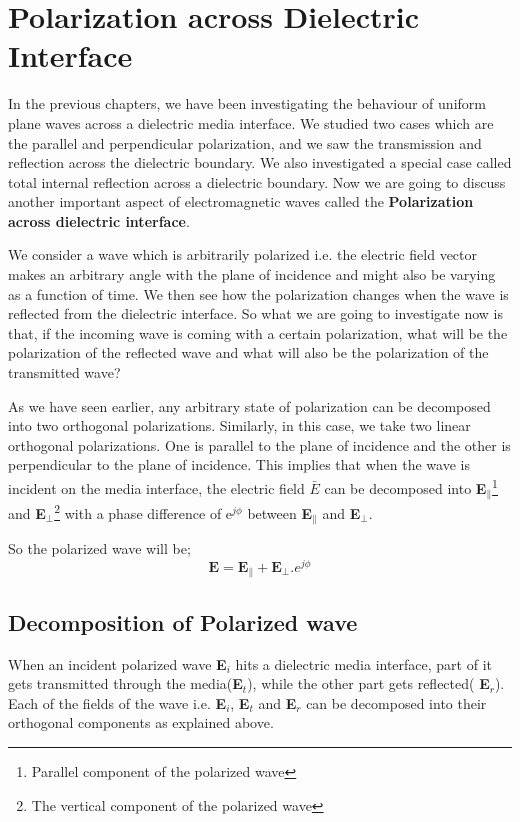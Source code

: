 \chapter{Polarization across Dielectric Interface}\label{lec:lec33}
In the previous chapters, we have been investigating the behaviour of uniform plane waves across a dielectric media interface. We studied two cases which are the parallel and perpendicular polarization, and we saw the transmission and reflection across the dielectric boundary. We also investigated a special case called total internal reflection across a dielectric boundary. Now we are going to discuss another important aspect of electromagnetic waves called the \textbf{Polarization across dielectric interface}. 

We consider a wave which is arbitrarily polarized i.e. the electric field vector makes an arbitrary angle with the plane of incidence and might also be varying as a function of time. We then see how the polarization changes when the wave is reflected from the dielectric interface. So what we are going to investigate now is that, if the incoming wave is coming with a certain polarization, what will be the polarization of the reflected wave and what will also be the polarization of the transmitted wave?

As we have seen earlier, any arbitrary state of polarization can be decomposed into two orthogonal polarizations. Similarly, in this case, we take two linear orthogonal polarizations. One is parallel to the plane of incidence and the other is perpendicular to the plane of incidence. This implies that when the wave is incident on the media interface, the electric field \textbf{$\bar{E}$} can be decomposed into \textbf{E}$_\parallel$\footnote{
Parallel component of the polarized wave
} and \textbf{E}$_\perp$\footnote{
The vertical component of the polarized wave
} with a phase difference of e$^{j\phi}$ between \textbf{E}$_\parallel$ and \textbf{E}$_\perp$.

So the polarized wave will be; $$\textbf{E} = \textbf{E}_\parallel + \textbf{E}_\perp.e^{j\phi}$$	

\section{Decomposition of Polarized wave}	
When an incident polarized wave \textbf{E$_i$} hits a dielectric media interface, part of it gets transmitted through the media(\textbf{E$_t$}), while the other part gets reflected( \textbf{E$_r$}). Each of the fields of the wave i.e. \textbf{E$_i$}, \textbf{E$_t$} and \textbf{E$_r$} can be decomposed into their orthogonal components as explained above.	
